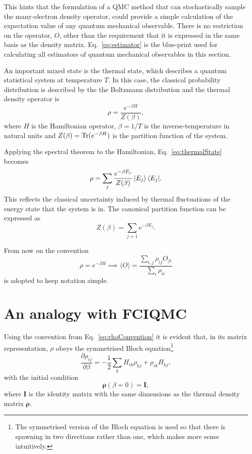 This hints that the formulation of a QMC method that can stochastically sample the many-electron density operator, could provide a simple calculation of the expectation value of any quantum mechanical observable. There is no restriction on the operator, $O$, other than the requirement that it is expressed in the same basis as the density matrix. Eq.~\ref{eq:estimator} is the blue-print used for calculating all estimators of quantum mechanical observables in this section.

An important mixed state is the thermal state\cite{Isham}, which describes a quantum statistical system at temperature $T$. In this case, the classical probability distribution is described by the the Boltzmann distribution and the thermal density operator is
\begin{equation}
\label{eq:thermalState}
\rho = \frac{e^{-\beta H}}{Z(\beta)},
\end{equation}
where $H$ is the Hamiltonian operator, $\beta=1/T$ is the inverse-temperature in natural units and $Z(\beta) = \textnormal{Tr}(e^{-\beta H})$ is the partition function of the system.

Applying the spectral theorem to the Hamiltonian, Eq.~\ref{eq:thermalState} becomes
\begin{equation}
\rho = \sum_j{\frac{e^{-\beta E_j}}{Z(\beta)}\ket{E_j}\bra{E_j}}. 
\end{equation}
This reflects the classical uncertainty induced by thermal fluctuations of the energy state that the system is in. The canonical partition function can be expressed as
\begin{equation}
\label{eq:PartitionFunction}
Z(\beta) = \sum_{j=1}e^{-\beta E_j}.
\end{equation}

From now on the convention
\begin{equation}
\label{eq:rhoConvention}
\rho =  e^{-\beta H} \implies \langle O \rangle = \frac{\sum_{i,j}\rho_{ij} O_{ji}}{\sum_i\rho_{ii}}
\end{equation}
is adopted to keep notation simple.

\section{An analogy with FCIQMC}
Using the convention from Eq.~\ref{eq:rhoConvention} it is evident that, in its matrix representation, $\rho$ obeys the symmetrised Bloch equation\cite{FoulkesSpencer2011}\footnote{The symmetrised version of the Bloch equation is used so that there is spawning in two directions rather than one, which makes more sense intuitively. }
\begin{equation}
\label{eq:numeratorPDE}
\frac{\partial\rho_{ij}}{\partial\beta} = -\frac{1}{2}\sum_{k}H_{ik}\rho_{kj}+\rho_{ik}H_{kj},
\end{equation}
with the initial condition
\begin{equation}
\bm{\rho}\left(\beta = 0\right) = \bm{I},
\end{equation}
where $\bm{I}$ is the identity matrix with the same dimensions as the thermal density matrix $\bm{\rho}$.

